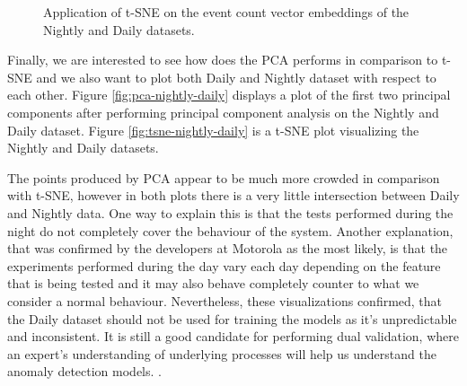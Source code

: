 

\begin{figure}%
    \centering
    \qquad
    \caption{Application of t-SNE on the event count vector embeddings of the Nightly and Daily datasets.}%
    \label{fig:tsne-single}%
\end{figure}

Finally, we are interested to see how does the PCA performs in comparison to t-SNE and we also want to plot both Daily and Nightly dataset with respect to each other. Figure \ref{fig:pca-nightly-daily} displays a plot of the first two principal components after performing principal component analysis on the Nightly and Daily dataset. Figure \ref{fig:tsne-nightly-daily} is a t-SNE plot visualizing the Nightly and Daily datasets.

The points produced by PCA appear to be much more crowded in comparison with t-SNE, however in both plots there is a very little intersection between Daily and Nightly data. One way to explain this is that the tests performed during the night do not completely cover the behaviour of the system. Another explanation, that was confirmed by the developers at Motorola as the most likely, is that the experiments performed during the day vary each day depending on the feature that is being tested and it may also behave completely counter to what we consider a normal behaviour. Nevertheless, these visualizations confirmed, that the Daily dataset should not be used for training the models as it's unpredictable and inconsistent. It is still a good candidate for performing dual validation, where an expert's understanding of underlying processes will help us understand the anomaly detection models. .

